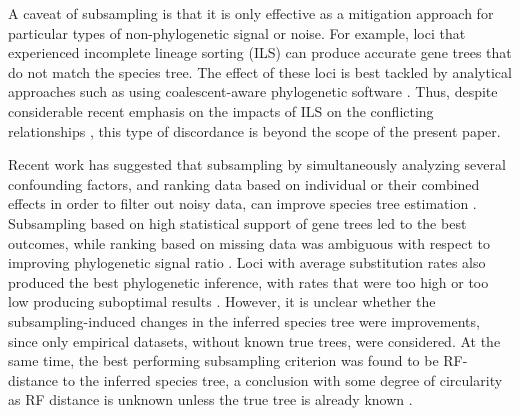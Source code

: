 \documentclass[../main.tex]{subfiles}
\begin{document}
A caveat of subsampling is that it is only effective  as a mitigation
approach for particular types of non-phylogenetic signal or noise.
For example, loci that experienced incomplete lineage sorting (ILS) can produce accurate gene trees that do not match the species tree.
The effect of these loci is best tackled by  analytical approaches such as using coalescent-aware phylogenetic software \citep{Zhang2018-sb,Chifman2014-gs}.
Thus, despite considerable recent emphasis on the impacts of ILS on the conflicting relationships \citep{Edwards2009-uk, Rannala2020-zb}, this type of discordance is beyond the scope of the present paper.

 
Recent work has suggested that subsampling by simultaneously analyzing several confounding factors, and ranking data based on individual or their combined effects in order to filter out noisy data, can improve species tree estimation \citep{Mongiardino_Koch2021-ai}. %
Subsampling based on high statistical support of gene trees led to the best outcomes, while ranking based on missing data was ambiguous with respect to improving phylogenetic signal ratio \citep{Mongiardino_Koch2021-ai}. Loci with average substitution rates also produced the best phylogenetic inference, with rates that were too high or too low producing suboptimal results \citep{Mongiardino_Koch2021-ai}.
However, it is unclear whether the subsampling-induced changes in the inferred species tree were improvements, since only empirical datasets, without known true trees, were considered. At the same time, the best performing subsampling criterion was found to be RF-distance to the inferred species tree, a conclusion with some degree of circularity as RF distance is unknown unless the true tree is already known \citep{Mongiardino_Koch2021-ai}.
\end{document}
